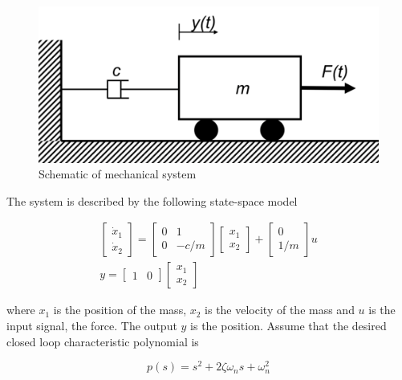 \begin{figure}[!htb]
\begin{center}
\includegraphics[scale=0.280]{img/state_feedback/Mechanical_system_3_1_1_ex_4.png}
\end{center}
\caption{Schematic of mechanical system}
\label{Mechanical_system_3_1_1_ex_4}
\end{figure}

The system is described by the following state-space model

\begin{eqnarray}
\begin{bmatrix}
 \dot{x}_1 \\
 \dot{x}_2 
\end{bmatrix} =  
\begin{bmatrix}
 0 & 1 \\
 0 & -c/m
\end{bmatrix}
\begin{bmatrix}
 x_1 \\
 x_2  
\end{bmatrix}+
\begin{bmatrix}
 0 \\
 1/m  
\end{bmatrix}u \\
y =
\begin{bmatrix}
 1 & 0 
\end{bmatrix}
\begin{bmatrix}
 x_1 \\
 x_2  
\end{bmatrix}
\end{eqnarray}

where $x_1$ is the position of the mass, $x_2$ is the velocity of the mass and $u$ is the input signal, the force. The output $y$ is the position. Assume that the desired closed loop characteristic polynomial is

\begin{equation}
p(s) = s^2 + 2\zeta \omega_n s +\omega_{n}^{2}  
\end{equation}

